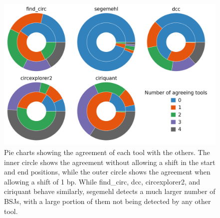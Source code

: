 \begin{figure}[ht]
    \centering

    \includegraphics[width=\textwidth]{chapters/4_results_and_discussion/figures/detection/min_samples_0/pies.png}
    \caption{Pie charts showing the agreement of each tool with the others.
        The inner circle shows the agreement without allowing a shift in the start and
        end positions, while the outer circle shows the agreement when allowing a shift
        of 1 bp.
        While find\_circ, dcc, circexplorer2, and ciriquant behave similarly, segemehl
        detects a much larger number of BSJs, with a large portion of them not being
        detected by any other tool.
    }
    \label{fig:detection_pies}
\end{figure}

